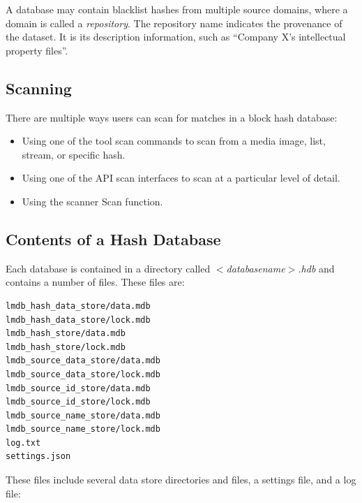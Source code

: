 \documentclass[11pt,fleqn]{article} %
\begin{document}
A database may contain blacklist hashes from multiple source domains,
where a domain is called a \textit{repository}.
The repository name indicates the provenance of the dataset.
It is its description information, such as ``Company X's intellectual property files''.\\

\subsection{Scanning}
There are multiple ways users can scan for matches in a block hash database:

\begin{itemize}
\item Using one of the \hdb tool scan commands to scan from a media image,
list, stream, or specific hash.
\item Using one of the \hdb API scan interfaces to scan at a particular
level of detail.
\item Using the \bulk \hdb scanner Scan function.
\end{itemize}

\subsection{Contents of a Hash Database}
Each \hdb database is contained in a directory called \textit{$<$databasename$>$.hdb} and contains a number of files. These files are:

\begingroup
\footnotesize
\begin{Verbatim}[fontfamily=courier]
lmdb_hash_data_store/data.mdb
lmdb_hash_data_store/lock.mdb
lmdb_hash_store/data.mdb
lmdb_hash_store/lock.mdb
lmdb_source_data_store/data.mdb
lmdb_source_data_store/lock.mdb
lmdb_source_id_store/data.mdb
lmdb_source_id_store/lock.mdb
lmdb_source_name_store/data.mdb
lmdb_source_name_store/lock.mdb
log.txt
settings.json
\end{Verbatim}
\endgroup

These files include several data store directories and files, a settings file, and a log file:
\end{document}
